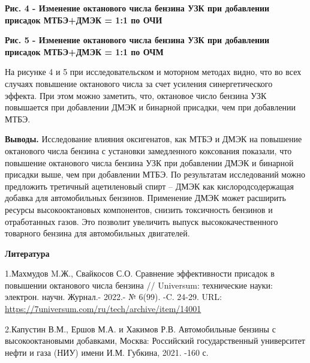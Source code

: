 % 

{\bfseries Рис. 4 - Изменение октанового числа бензина УЗК при добавлении
присадок МТБЭ+ДМЭК = 1:1 по ОЧИ}

{\bfseries Рис. 5 - Изменение октанового числа бензина УЗК при добавлении
присадок МТБЭ+ДМЭК = 1:1 по ОЧМ}

На рисунке 4 и 5 при исследовательском и моторном методах видно, что во
всех случаях повышение октанового числа за счет усиления
синергетического эффекта. При этом можно заметить, что, октановое число
бензина УЗК повышается при добавлении ДМЭК и бинарной присадки, чем при
добавлении МТБЭ.

{\bfseries Выводы.} Исследование влияния оксигенатов, как МТБЭ и ДМЭК на
повышение октанового числа бензина с установки замедленного коксования
показали, что повышение октанового числа бензина УЗК при добавлении ДМЭК
и бинарной присадки выше, чем при добавлении МТБЭ. По результатам
исследований можно предложить третичный ацетиленовый спирт -- ДМЭК как
кислородсодержащая добавка для автомобильных бензинов. Применение ДМЭК
может расширить ресурсы высокооктановых компонентов, снизить токсичность
бензинов и отработанных газов. Это позволит увеличить выпуск
высококачественного товарного бензина для автомобильных двигателей.

{\bfseries Литература}

1.Махмудов M.Ж., Свайкосов С.О. Сравнение эффективности присадок в
повышении октанового числа бензина // Universum: технические науки:
электрон. научн. Журнал.- 2022.- № 6(99). -C. 24-29. URL:
\url{https://7universum.com/ru/tech/archive/item/14001}

2.Капустин В.М., Ершов М.А. и Хакимов Р.В. Автомобильные бензины с
высокооктановыми добавками, Москва: Российский государственный
университет нефти и газа (НИУ) имени И.М. Губкина, 2021. -160 с.

